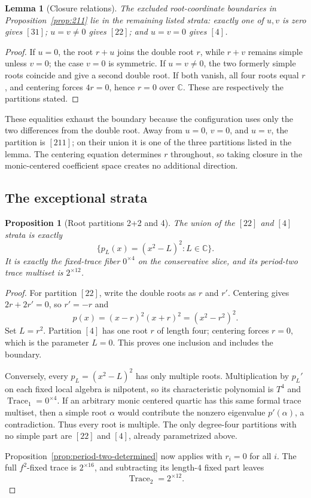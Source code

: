 \documentclass[11pt]{article}
\newtheorem{proposition}[theorem]{Proposition}
\newtheorem{lemma}[theorem]{Lemma}
\theoremstyle{definition}
\newcommand{\C}{\mathbb C}
\newcommand{\Trace}{\operatorname{Trace}}
\begin{document}
\begin{lemma}[Closure relations]
\label{lem:boundaries}
The excluded root-coordinate boundaries in Proposition~\ref{prop:211} lie in the remaining listed strata: exactly one of $u,v$ is zero gives $[31]$; $u=v\ne0$ gives $[22]$; and $u=v=0$ gives $[4]$.
\end{lemma}

\begin{proof}
If $u=0$, the root $r+u$ joins the double root $r$, while $r+v$ remains simple unless $v=0$; the case $v=0$ is symmetric. If $u=v\ne0$, the two formerly simple roots coincide and give a second double root. If both vanish, all four roots equal $r$, and centering forces $4r=0$, hence $r=0$ over $\C$. These are respectively the partitions stated.
\end{proof}

These equalities exhaust the boundary because the configuration uses only the two differences from the double root. Away from $u=0$, $v=0$, and $u=v$, the partition is $[211]$; on their union it is one of the three partitions listed in the lemma. The centering equation determines $r$ throughout, so taking closure in the monic-centered coefficient space creates no additional direction.

\subsection{The exceptional strata}

\begin{proposition}[Root partitions 2+2 and 4]
\label{prop:exceptional-strata}
The union of the $[22]$ and $[4]$ strata is exactly
\[
\{p_L(x)=(x^2-L)^2:L\in\C\}.
\]
It is exactly the fixed-trace fiber $0^{\times4}$ on the conservative slice, and its period-two trace multiset is $2^{\times12}$.
\end{proposition}

\begin{proof}
For partition $[22]$, write the double roots as $r$ and $r'$. Centering gives $2r+2r'=0$, so $r'=-r$ and
\[
p(x)=(x-r)^2(x+r)^2=(x^2-r^2)^2.
\]
Set $L=r^2$. Partition $[4]$ has one root $r$ of length four; centering forces $r=0$, which is the parameter $L=0$. This proves one inclusion and includes the boundary.

Conversely, every $p_L=(x^2-L)^2$ has only multiple roots. Multiplication by $p_L'$ on each fixed local algebra is nilpotent, so its characteristic polynomial is $T^4$ and $\Trace_1=0^{\times4}$. If an arbitrary monic centered quartic has this same formal trace multiset, then a simple root $\alpha$ would contribute the nonzero eigenvalue $p'(\alpha)$, a contradiction. Thus every root is multiple. The only degree-four partitions with no simple part are $[22]$ and $[4]$, already parametrized above.

Proposition~\ref{prop:period-two-determined} now applies with $r_i=0$ for all $i$. The full $f^2$-fixed trace is $2^{\times16}$, and subtracting its length-$4$ fixed part leaves
\[
\Trace_2=2^{\times12}.
\]
\end{proof}
\end{document}
